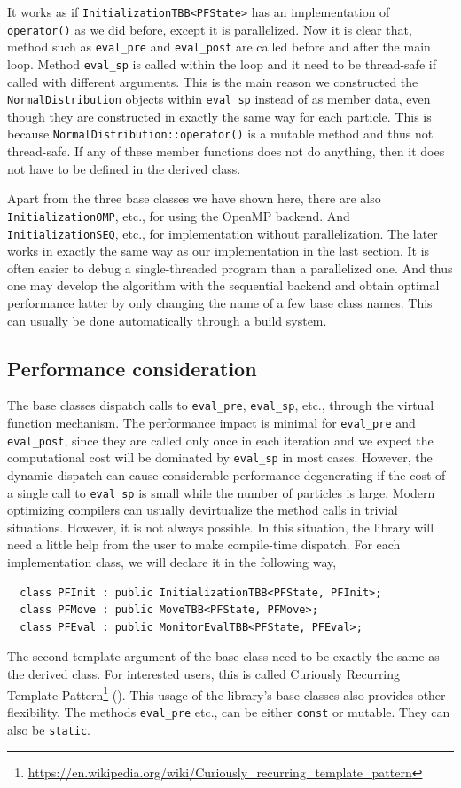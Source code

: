 It works as if \verb|InitializationTBB<PFState>| has an implementation of
\verb|operator()| as we did before, except it is parallelized. Now it is clear
that, method such as \verb|eval_pre| and \verb|eval_post| are called before and
after the main loop. Method \verb|eval_sp| is called within the loop and it
need to be thread-safe if called with different arguments. This is the main
reason we constructed the \verb|NormalDistribution| objects within
\verb|eval_sp| instead of as member data, even though they are constructed in
exactly the same way for each particle. This is because
\verb|NormalDistribution::operator()| is a mutable method and thus not
thread-safe. If any of these member functions does not do anything, then it
does not have to be defined in the derived class.

Apart from the three base classes we have shown here, there are also
\verb|InitializationOMP|, etc., for using the OpenMP backend. And
\verb|InitializationSEQ|, etc., for implementation without parallelization. The
later works in exactly the same way as our implementation in the last section.
It is often easier to debug a single-threaded program than a parallelized one.
And thus one may develop the algorithm with the sequential backend and obtain
optimal performance latter by only changing the name of a few base class names.
This can usually be done automatically through a build system.

\subsection{Performance consideration}
\label{sec:Performance consideration}

The base classes dispatch calls to \verb|eval_pre|, \verb|eval_sp|, etc.,
through the virtual function mechanism. The performance impact is minimal for
\verb|eval_pre| and \verb|eval_post|, since they are called only once in each
iteration and we expect the computational cost will be dominated by
\verb|eval_sp| in most cases. However, the dynamic dispatch can cause
considerable performance degenerating if the cost of a single call to
\verb|eval_sp| is small while the number of particles is large. Modern
optimizing compilers can usually devirtualize the method calls in trivial
situations. However, it is not always possible. In this situation, the library
will need a little help from the user to make compile-time dispatch. For each
implementation class, we will declare it in the following way,
\begin{Verbatim}
  class PFInit : public InitializationTBB<PFState, PFInit>;
  class PFMove : public MoveTBB<PFState, PFMove>;
  class PFEval : public MonitorEvalTBB<PFState, PFEval>;
\end{Verbatim}
The second template argument of the base class need to be exactly the same as
the derived class. For interested users, this is called Curiously Recurring
Template
Pattern\footnote{\url{https://en.wikipedia.org/wiki/Curiously_recurring_template_pattern}}
(\crtp). This usage of the library's base classes also provides other
flexibility. The methods \verb|eval_pre| etc., can be either \verb|const| or
mutable. They can also be \verb|static|.
